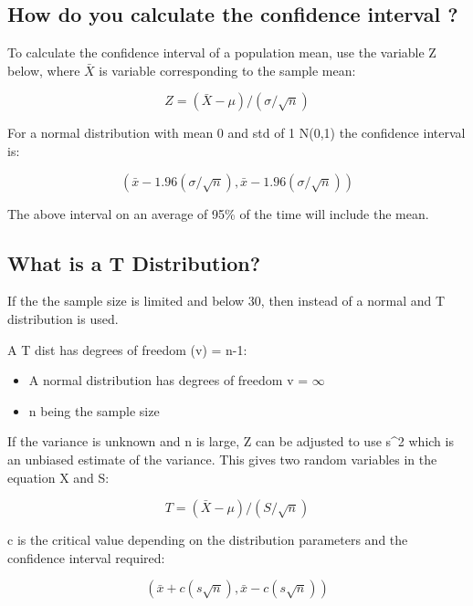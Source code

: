 \documentclass[11pt]{scrartcl} %
\begin{document}
\subsection{How do you calculate the confidence interval
?}

To calculate the confidence interval of a population mean, use the
variable Z below, where \(\bar{X}\) is variable corresponding to the
sample mean:

\begin{equation}
	Z = (\bar{X} - \mu)/ (\sigma/ \sqrt{n})
\end{equation}

For a normal distribution with mean 0 and std of 1 N(0,1) the confidence
interval is:

\begin{equation}
	(\bar{x} - 1.96 (\sigma/\sqrt{n}),\bar{x} - 1.96 (\sigma/\sqrt{n}))
\end{equation}

The above interval on an average of 95\% of the time will include the
mean.

\subsection{What is a T
Distribution?}

If the the sample size is limited and below 30, then instead of a normal
and T distribution is used.

A T dist has degrees of freedom (v) = n-1:

\begin{itemize}
\item A normal distribution has degrees of freedom v = \(\infty\)
\item n being the sample size
\end{itemize}

If the variance is unknown and n is large, Z can be adjusted to use
s\^{}2 which is an unbiased estimate of the variance. This gives two
random variables in the equation X and S:

\begin{equation}
	T = (\bar{X} - \mu)/ (S/\sqrt{n})
\end{equation}

c is the critical value depending on the distribution parameters and the
confidence interval required:

\begin{equation}
	(\bar{x} + c(s\sqrt{n}),\bar{x} - c(s\sqrt{n}))
\end{equation}
\end{document}
